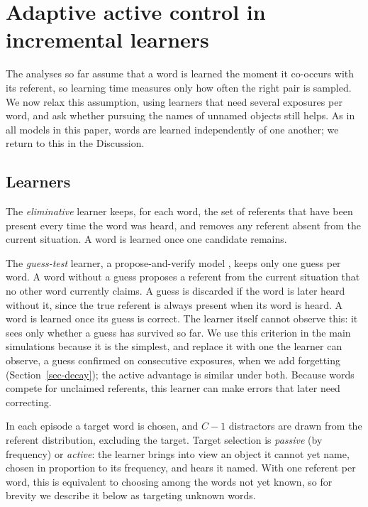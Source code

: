 \documentclass[a4paper,natbib,man]{apa6}
\begin{document}
\section{Adaptive active control in incremental learners}
\label{sec-incremental-sim}

The analyses so far assume that a word is learned the moment it co-occurs with its referent, so learning time measures only how often the right pair is sampled. We now relax this assumption, using learners that need several exposures per word, and ask whether pursuing the names of unnamed objects still helps. As in all models in this paper, words are learned independently of one another; we return to this in the Discussion.

\subsection{Learners}
The \textit{eliminative} learner \citep{Siskind:1996,Vogt:2012} keeps, for each word, the set of referents that have been present every time the word was heard, and removes any referent absent from the current situation. A word is learned once one candidate remains.

The \textit{guess-test} learner, a propose-and-verify model \citep[e.g.,][]{Trueswell:2013}, keeps only one guess per word. A word without a guess proposes a referent from the current situation that no other word currently claims. A guess is discarded if the word is later heard without it, since the true referent is always present when its word is heard. A word is learned once its guess is correct. The learner itself cannot observe this: it sees only whether a guess has survived so far. We use this criterion in the main simulations because it is the simplest, and replace it with one the learner can observe, a guess confirmed on consecutive exposures, when we add forgetting (Section~\ref{sec-decay}); the active advantage is similar under both. Because words compete for unclaimed referents, this learner can make errors that later need correcting.

In each episode a target word is chosen, and $C-1$ distractors are drawn from the referent distribution, excluding the target. Target selection is \textit{passive} (by frequency) or \textit{active}: the learner brings into view an object it cannot yet name, chosen in proportion to its frequency, and hears it named. With one referent per word, this is equivalent to choosing among the words not yet known, so for brevity we describe it below as targeting unknown words.
\end{document}
